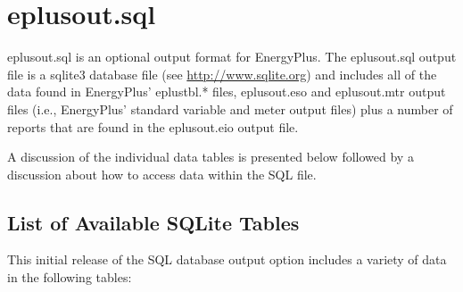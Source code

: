 \section{eplusout.sql}

eplusout.sql is an optional output format for EnergyPlus. The eplusout.sql output file is a sqlite3 database file (see \url{http://www.sqlite.org}) and includes all of the data found in EnergyPlus’ eplustbl.* files, eplusout.eso and eplusout.mtr output files (i.e., EnergyPlus’ standard variable and meter output files) plus a number of reports that are found in the eplusout.eio output file.

A discussion of the individual data tables is presented below followed by a discussion about how to access data within the SQL file.

\subsection{List of Available SQLite Tables}

This initial release of the SQL database output option includes a variety of data in the following tables:

